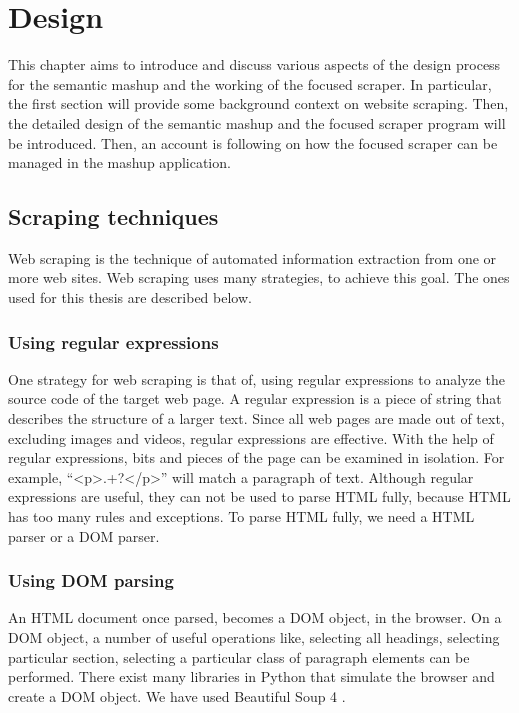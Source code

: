 \chapter{Design}
This chapter aims to introduce and discuss various aspects of the design process for the semantic mashup and the working of the focused scraper. In particular, the first section will provide some background context on website scraping. Then, the detailed design of the semantic mashup and the focused scraper program will be introduced. Then, an account is following on how the focused scraper can be managed in the mashup application.

\section{Scraping techniques}
Web scraping is the technique of automated information extraction from one or more web sites. Web scraping uses many strategies, to achieve this goal. The ones used for this thesis are described below.

\subsection{Using regular expressions}
One strategy for web scraping is that of, using regular expressions to analyze the source code of the target web page. A regular expression is a piece of string that describes the structure of a larger text. Since all web pages are made out of text, excluding images and videos, regular expressions are effective. With the help of regular expressions, bits and pieces of the page can be examined in isolation. For example, “<p>.+?</p>” will match a paragraph of text. Although regular expressions are useful, they can not be used to parse HTML fully, because HTML has too many rules and exceptions. To parse HTML fully, we need a HTML parser or a DOM parser.

\subsection{Using DOM parsing}
An HTML document once parsed, becomes a DOM object, in the browser. On a DOM object, a number of useful operations like, selecting all headings, selecting particular section, selecting a particular class of paragraph elements can be performed. There exist many libraries in Python that simulate the browser and create a DOM object. We have used Beautiful Soup 4 \cite{6}.


